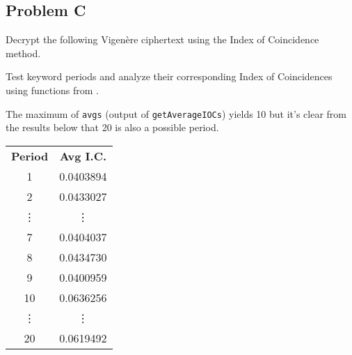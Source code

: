 \documentclass[../hw_sols.tex]{subfiles}
\begin{document}
\newpage



\subsection*{Problem C}

Decrypt the following Vigenère ciphertext using the Index of Coincidence 
method.

\begin{solution}

Test keyword periods and analyze their corresponding Index of Coincidences 
using functions from .



\newpage

The maximum of \verb|avgs| (output of \verb|getAverageIOCs|) yields 10 but 
it's clear from the results below that 20 is also a possible period.

\begin{minipage}{0.25\linewidth}
	\begin{tabular}{ c c }
		\textbf{Period} & \textbf{Avg I.C.} \\
		1 & 0.0403894 \\
		2 & 0.0433027 \\
		\vdots & \vdots \\
		7 & 0.0404037 \\
		8 & 0.0434730 \\
		9 & 0.0400959 \\
		\rowcolor{yellow!75} 10 & 0.0636256 \\
		\vdots & \vdots \\
		\rowcolor{yellow!75} 20 & 0.0619492
	\end{tabular}
\end{minipage}
\begin{minipage}{0.7\linewidth}
\end{minipage}


\end{solution}
\end{document}
